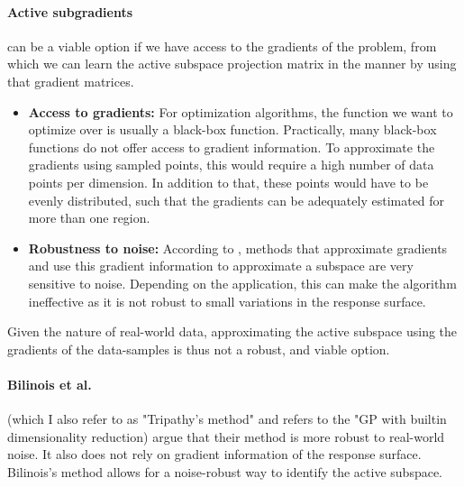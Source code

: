 \paragraph{Active subgradients} can be a viable option if we have access to the gradients of the problem, from which we can learn the active subspace projection matrix in the manner by using that gradient matrices.

\begin{itemize}

\item \textbf{Access to gradients:} For optimization algorithms, the function we want to optimize over is usually a black-box function.
Practically, many black-box functions do not offer access to gradient information.
To approximate the gradients using sampled points, this would require a high number of data points per dimension.
In addition to that, these points would have to be evenly distributed, such that the gradients can be adequately estimated for more than one region.

\item \textbf{Robustness to noise:} According to \citep{Tripathy}, methods that approximate gradients and use this gradient information to approximate a subspace are very sensitive to noise.
Depending on the application, this can make the algorithm ineffective as it is not robust to small variations in the response surface.

\end{itemize}

Given the nature of real-world data, approximating the active subspace using the gradients of the data-samples is thus not a robust, and viable option.

\paragraph{Bilinois et al.} (which I also refer to as "Tripathy's method" and refers to the "GP with builtin dimensionality reduction) argue that their method is more robust to real-world noise. 
It also does not rely on gradient information of the response surface.
Bilinois's method allows for a noise-robust way to identify the active subspace.

